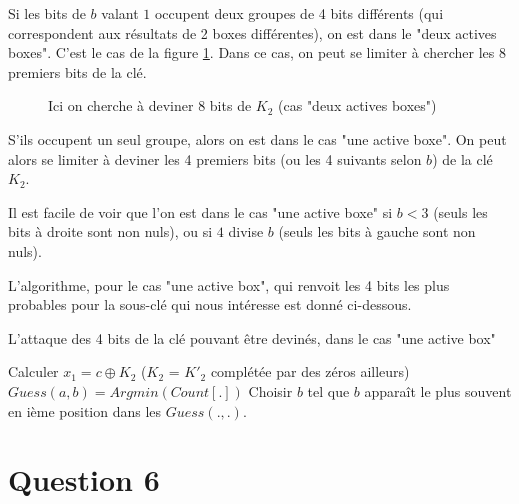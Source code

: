 Si les bits de $b$ valant $1$ occupent deux groupes de 4 bits différents (qui correspondent aux résultats de 2 boxes différentes), on est dans le "deux actives boxes". C'est le cas de la figure \ref{illustration_bits_key}. Dans ce cas, on peut se limiter à chercher les 8 premiers bits de la clé.


\begin{figure}[!h]
\centering
{}
\caption{Ici on cherche à deviner 8 bits de $K_2$ (cas "deux actives boxes")}
\label{illustration_bits_key}
\end{figure}


S'ils occupent un seul groupe, alors on est dans le cas "une active boxe". On peut alors se limiter à deviner les 4 premiers bits (ou les 4 suivants selon $b$) de la clé $K_2$.

Il est facile de voir que l'on est dans le cas "une active boxe" si $b < 3$ (seuls les bits à droite sont non nuls), ou si $4$ divise $b$ (seuls les bits à gauche sont non nuls). 

L'algorithme, pour le cas "une active box", qui renvoit les 4 bits les plus probables pour la sous-clé qui nous intéresse est donné ci-dessous.

\begin{algorithm}
\caption{L'attaque des 4 bits de la clé pouvant être devinés, dans le cas "une active box"}
	{
		{
			Calculer $x_1 = c \oplus K_2$ ($K_2$ = $K'_2$ complétée par des zéros ailleurs) \\
		}
		$Guess(a,b) = Argmin \left( Count[.] \right)$
	}
	{
		Choisir $b$ tel que $b$ apparaît le plus souvent en ième position dans les $Guess(.,.)$.
	}
\end{algorithm}

\section*{Question 6}





